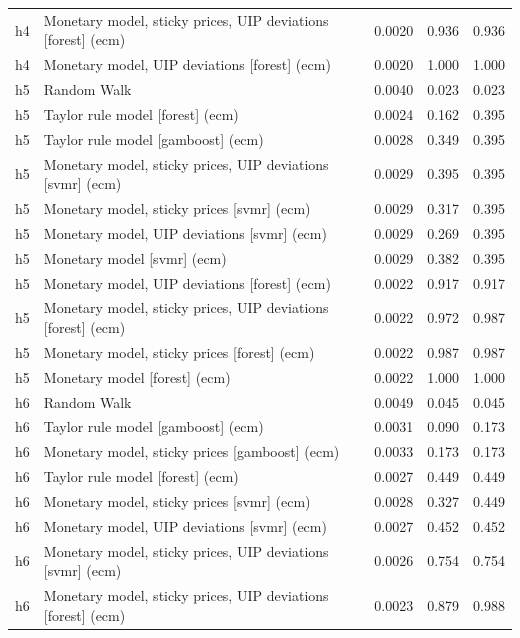 \begin{ThreePartTable}
\begin{longtable}[t]{cp{5.5cm}ccc}
h4 & \raggedright Monetary model, sticky prices, UIP deviations [forest] (ecm) & 0.0020 & 0.936 & 0.936\\
h4 & \raggedright Monetary model, UIP deviations [forest] (ecm) & 0.0020 & 1.000 & 1.000\\
\addlinespace
h5 & \raggedright Random Walk & 0.0040 & 0.023 & 0.023\\
h5 & \raggedright Taylor rule model [forest] (ecm) & 0.0024 & 0.162 & 0.395\\
h5 & \raggedright Taylor rule model [gamboost] (ecm) & 0.0028 & 0.349 & 0.395\\
h5 & \raggedright Monetary model, sticky prices, UIP deviations [svmr] (ecm) & 0.0029 & 0.395 & 0.395\\
h5 & \raggedright Monetary model, sticky prices [svmr] (ecm) & 0.0029 & 0.317 & 0.395\\
h5 & \raggedright Monetary model, UIP deviations [svmr] (ecm) & 0.0029 & 0.269 & 0.395\\
h5 & \raggedright Monetary model [svmr] (ecm) & 0.0029 & 0.382 & 0.395\\
h5 & \raggedright Monetary model, UIP deviations [forest] (ecm) & 0.0022 & 0.917 & 0.917\\
h5 & \raggedright Monetary model, sticky prices, UIP deviations [forest] (ecm) & 0.0022 & 0.972 & 0.987\\
h5 & \raggedright Monetary model, sticky prices [forest] (ecm) & 0.0022 & 0.987 & 0.987\\
h5 & \raggedright Monetary model [forest] (ecm) & 0.0022 & 1.000 & 1.000\\
\addlinespace
h6 & \raggedright Random Walk & 0.0049 & 0.045 & 0.045\\
h6 & \raggedright Taylor rule model [gamboost] (ecm) & 0.0031 & 0.090 & 0.173\\
h6 & \raggedright Monetary model, sticky prices [gamboost] (ecm) & 0.0033 & 0.173 & 0.173\\
h6 & \raggedright Taylor rule model [forest] (ecm) & 0.0027 & 0.449 & 0.449\\
h6 & \raggedright Monetary model, sticky prices [svmr] (ecm) & 0.0028 & 0.327 & 0.449\\
h6 & \raggedright Monetary model, UIP deviations [svmr] (ecm) & 0.0027 & 0.452 & 0.452\\
h6 & \raggedright Monetary model, sticky prices, UIP deviations [svmr] (ecm) & 0.0026 & 0.754 & 0.754\\
h6 & \raggedright Monetary model, sticky prices, UIP deviations [forest] (ecm) & 0.0023 & 0.879 & 0.988\\

\end{longtable}
\end{ThreePartTable}
